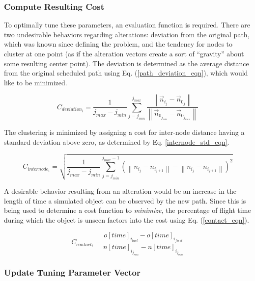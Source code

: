 \documentclass[conf]{new-aiaa}
\begin{document}
\subsubsection{Compute Resulting Cost}
To optimally tune these parameters, an evaluation function is required. There are two undesirable behaviors regarding alterations: deviation from the original path, which was known since defining the problem, and the tendency for nodes to cluster at one point (as if the alteration vectors create a sort of ``gravity'' about some resulting center point). The deviation is determined as the average distance from the original scheduled path using Eq. (\ref{path_deviation_eqn}), which would like to be minimized. 

\begin{equation}
\label{path_deviation_eqn}
C_{deviation_i} = \frac{1}{j_{max} - j_{min}}\sum\limits_{j=j_{min}}^{j_{max}}\frac{\left\|\vec{n}_{i_j} - \vec{n}_{0_j}\right\|}{\left\|\vec{n}_{0_{j_{min}}} - \vec{n}_{0_{j_{max}}}\right\|}
\end{equation}

The clustering is minimized by assigning a cost for inter-node distance having a standard deviation above zero, as determined by Eq. \ref{internode_std_eqn}.

\begin{equation}
\label{internode_std_eqn}
C_{internode_i} = \sqrt{\frac{1}{j_{max} - j_{min}}\sum\limits_{j=j_{min}}^{j_{max} - 1}\left(\left\|n_{i_j} - n_{i_{j + 1}}\right\| - \overline{\left\|n_{i_j} - n_{i_{j + 1}}\right\|}\right)^2}
\end{equation}

A desirable behavior resulting from an alteration would be an increase in the length of time a simulated object can be observed by the new path. Since this is being used to determine a cost function to \emph{minimize}, the percentage of flight time during which the object is unseen factors into the cost using Eq. (\ref{contact_eqn}).

\begin{equation}
\label{contact_eqn}
C_{contact_i} = \frac{o[time]_{i_{last}} - o[time]_{i_{first}}}{n[time]_{i_{j_{max}}} - n[time]_{i_{j_{min}}}}
\end{equation}

\subsubsection{Update Tuning Parameter Vector}
\end{document}
